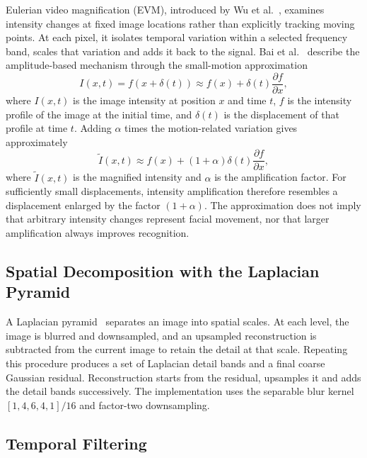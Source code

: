 Eulerian video magnification (EVM), introduced by Wu et al.~\cite{wu2012}, examines intensity changes at fixed image locations rather than explicitly tracking moving points. At each pixel, it isolates temporal variation within a selected frequency band, scales that variation and adds it back to the signal. Bai et al.~\cite{bai2021} describe the amplitude-based mechanism through the small-motion approximation
\begin{equation}
	I(x,t)=f(x+\delta(t))
	\approx f(x)+\delta(t)\frac{\partial f}{\partial x},
	\label{eq:evm-small-motion}
\end{equation}
where $I(x,t)$ is the image intensity at position $x$ and time $t$, $f$ is the intensity profile of the image at the initial time, and $\delta(t)$ is the displacement of that profile at time $t$. Adding $\alpha$ times the motion-related variation gives approximately
\begin{equation}
	\widetilde I(x,t)\approx
	f(x)+(1+\alpha)\delta(t)\frac{\partial f}{\partial x},
	\label{eq:evm-magnified}
\end{equation}
where $\widetilde I(x,t)$ is the magnified intensity and $\alpha$ is the amplification factor. For sufficiently small displacements, intensity amplification therefore resembles a displacement enlarged by the factor $(1+\alpha)$. The approximation does not imply that arbitrary intensity changes represent facial movement, nor that larger amplification always improves recognition.

\subsection{Spatial Decomposition with the Laplacian Pyramid}
\label{sec:laplacian-pyramid}

A Laplacian pyramid~\cite{burt1983} separates an image into spatial scales. At each level, the image is blurred and downsampled, and an upsampled reconstruction is subtracted from the current image to retain the detail at that scale. Repeating this procedure produces a set of Laplacian detail bands and a final coarse Gaussian residual. Reconstruction starts from the residual, upsamples it and adds the detail bands successively. The implementation uses the separable blur kernel $[1,4,6,4,1]/16$ and factor-two downsampling.

\subsection{Temporal Filtering}
\label{sec:temporal-filtering}

